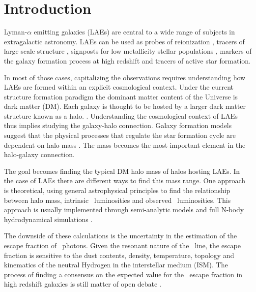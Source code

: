 \documentclass{emulateapj}
\newcommand{\ly}{{\ifmmode{{\rm Ly}\alpha}\else{Ly$\alpha$}\fi}}
\begin{document}

\section{Introduction}
\label{sec:introduction}

Lyman-$\alpha$ emitting galaxies (LAEs) are central to a wide range
of subjects in extragalactic astronomy. 
LAEs can be used as probes of reionization \citep[for a recent review
  see][and references therein]{Dijkstra14}, tracers  of large scale structure
\citep{Koehler2007}, signposts for low metallicity stellar
populations \citep[for a recent review see][and references
  therein]{Hayes15}, markers of the galaxy formation process at high
redshift \citep{Partridge67,Rhoads00,Blanc11} and tracers of active
star formation.    
 
In most of those cases, capitalizing the observations requires
understanding how LAEs are formed within an explicit cosmological
context.  
Under the current structure formation paradigm the dominant matter
content of the Universe is dark matter (DM).  
Each galaxy is thought to be hosted by a larger dark matter structure
known as a halo. \citep{Peebles1980,SpringelNature05}.  
Understanding the cosmological context of LAEs thus implies studying
the galaxy-halo connection.  
Galaxy formation models suggest that the physical processes that
regulate the star formation cycle are dependent on halo mass
\citep[e.g.][]{Behroozi2013a}. 
The mass becomes the most important element in the halo-galaxy
connection.  
   
The goal becomes finding the typical DM halo mass of halos hosting LAEs.
In the case of LAEs there are different ways to find this mass range.
One approach is theoretical, using general astrophysical principles to
find the relationship between halo mass, intrinsic \ly\ luminosities
and observed \ly\ luminosities. 
This approach is usually implemented through semi-analytic models
\citep{Garel2012,Orsi2012} and  full N-body hydrodynamical simulations
\citep{Laursen2007, Dayal2009, ForeroRomero2011, Yajima2012}.  

The downside of these calculations is the uncertainty in the
estimation of the escape fraction of \ly\ photons. 
Given the resonant nature of the \ly\ line, the escape fraction is
sensitive to  the dust contents, density, temperature, topology and
kinematics of the neutral Hydrogen in the interstellar medium (ISM). 
The process of finding a consensus on the expected value for the
\ly\ escape fraction in high redshift galaxies is still matter of open
debate
\citep{Neufeld1991,Verhamme2006,ForeroRomero2012,Dijkstra2012,Laursen2013,Orsi2012,Yajima14}.       
\end{document}
